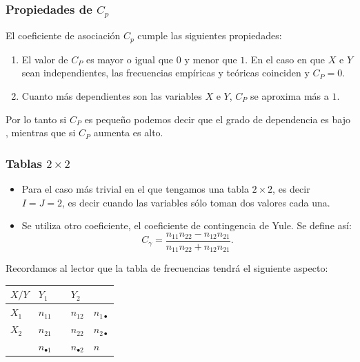 \begin{frame}
\frametitle{Propiedades de $C_p$}
 El coeficiente de asociación $C_p$ cumple las siguientes propiedades:
\begin{enumerate}[1)]
\item El valor de $C_P$ es mayor o igual que $0$ y menor que  $1$. En el caso en que  $X$  e  $Y$ sean independientes, las frecuencias empíricas y  teóricas coinciden y  $C_P=0$.
\item Cuanto más dependientes son las variables  $X$ e  $Y$,  $C_P$
se aproxima más a $1$.
\end{enumerate}
Por lo tanto si $C_P$  es pequeño podemos decir que el grado de dependencia es bajo ,
mientras que si $C_P$ aumenta es alto.
\end{frame}

\begin{frame}
\frametitle{Tablas $2\times 2$}
\begin{itemize}
\item Para el caso más trivial en el que  tengamos una tabla $2\times 2$, es decir $I=J=2$, es decir cuando las variables sólo toman dos valores cada una.
\item Se utiliza otro coeficiente, el coeficiente de contingencia de Yule.  Se define así:
$$
C_\gamma=\frac{n_{11} n_{22}-n_{12}n_{21}}{n_{11}n_{22}+n_{12}n_{21}}.
$$
\end{itemize}
\end{frame}



\begin{frame}
Recordamos al lector que la tabla de frecuencias tendrá el siguiente aspecto:
\begin{center}
\begin{tabular}{|l|lll|l|}
\cline{1-4} $X/Y$ & $Y_{1}$ && $Y_{2}$ &\multicolumn{1}{c}{} \\ \hline $X_1$ & $n_{11}$
&& $n_{12}$ & $n_{1\bullet}$\\ \hline $X_2$ & $n_{21}$ && $n_{22}$ & $n_{2\bullet}$\\
\hline \multicolumn{1}{c|}{} & $n_{\bullet 1}$ && $n_{\bullet 2}$ & $n$\\ \cline{2-5}
\end{tabular}
\end{center}
\end{frame}

